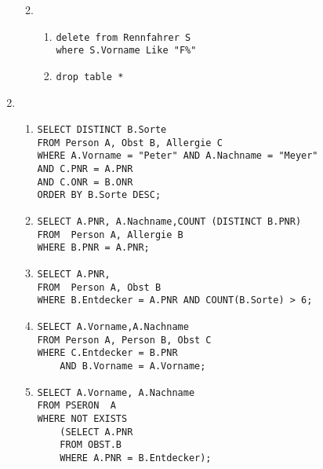 \documentclass{article}
\begin{document}
\begin{enumerate}
\begin{enumerate}
\begin{verbatim}
                    \end{verbatim}
                \item
                    \begin{enumerate}
                        \item
                            \begin{verbatim}
delete from Rennfahrer S
where S.Vorname Like "F%"      
                            \end{verbatim}
                        \item
                            \begin{verbatim}
drop table *                             
                            \end{verbatim}
                    \end{enumerate}
            \end{enumerate}
        \item %
            \begin{enumerate}
                \item 
                    \begin{verbatim}
SELECT DISTINCT B.Sorte
FROM Person A, Obst B, Allergie C
WHERE A.Vorname = "Peter" AND A.Nachname = "Meyer"
AND C.PNR = A.PNR   
AND C.ONR = B.ONR
ORDER BY B.Sorte DESC;
                    \end{verbatim}
                \item
                    \begin{verbatim}
SELECT A.PNR, A.Nachname,COUNT (DISTINCT B.PNR)
FROM  Person A, Allergie B
WHERE B.PNR = A.PNR;
                    \end{verbatim}

                \item
                    \begin{verbatim}
SELECT A.PNR,
FROM  Person A, Obst B
WHERE B.Entdecker = A.PNR AND COUNT(B.Sorte) > 6;
                    \end{verbatim}

                \item
                    \begin{verbatim}
SELECT A.Vorname,A.Nachname
FROM Person A, Person B, Obst C
WHERE C.Entdecker = B.PNR
    AND B.Vorname = A.Vorname;
                    \end{verbatim}

                \item
                    \begin{verbatim}
SELECT A.Vorname, A.Nachname
FROM PSERON  A
WHERE NOT EXISTS
    (SELECT A.PNR
    FROM OBST.B
    WHERE A.PNR = B.Entdecker);
                    \end{verbatim}
                \end{enumerate}


\end{enumerate}
\end{document}
